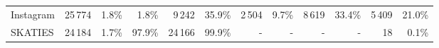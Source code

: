\begin{tabular}{lrrrrrrrrrrr}
Instagram           &       25\,774   &        1.8\% &                 1.8\% &              9\,242 &             35.9\% &              2\,504 &              9.7\% &              8\,619 &             33.4\% &             5\,409 &            21.0\% \\
SKATIES             &       24\,184   &        1.7\% &                97.9\% &             24\,166 &             99.9\% &                 -   &                 - &                 -    &                 -  &               18   &             0.1\% \\
\bottomrule
\end{tabular}
